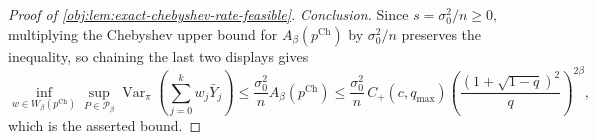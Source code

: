 \begin{proof}[Proof of \cref{obj:lem:exact-chebyshev-rate-feasible}]
\emph{Conclusion.}
Since \(s=\sigma_0^2/n\ge0\), multiplying the Chebyshev upper bound for \(A_\beta(p^{\mathrm{Ch}})\) by \(\sigma_0^2/n\) preserves the inequality, so chaining the last two displays gives
\[
\inf_{w\in W_\beta(p^{\mathrm{Ch}})}
\sup_{P\in\mathcal P_\beta}
\operatorname{Var}_\pi\!\left(\sum_{j=0}^k w_j\bar Y_j\right)
\le
\frac{\sigma_0^2}{n}
A_\beta\!\left(p^{\mathrm{Ch}}\right)
\le
\frac{\sigma_0^2}{n}\,
C_+(c,q_{\max})
\left(\frac{(1+\sqrt{1-q})^2}{q}\right)^{2\beta},
\]
which is the asserted bound.
\end{proof}
